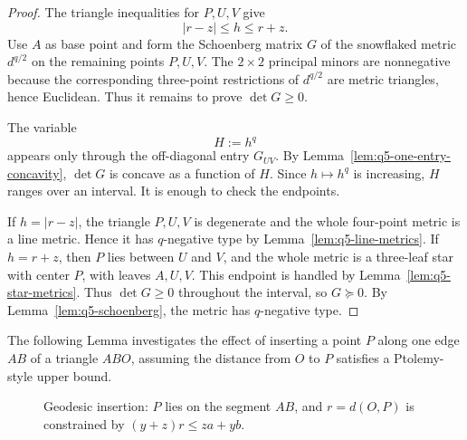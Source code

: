 \documentclass[12pt]{amsart}
\theoremstyle{definition}
\newcommand{\1}{\mathbf{1}}
\begin{document}
\begin{proof}
The triangle inequalities for $P,U,V$ give
\[
        |r-z|\le h\le r+z.
\]
Use $A$ as base point and form the Schoenberg matrix $G$ of the snowflaked metric
$d^{q/2}$ on the remaining points $P,U,V$.  The $2\times2$ principal minors
are nonnegative because the corresponding three-point restrictions of $d^{q/2}$ are
metric triangles, hence Euclidean.  Thus it remains to prove $\det G\ge0$.

The variable
\[
        H:=h^q
\]
appears only through the off-diagonal entry $G_{UV}$.  By
Lemma~\ref{lem:q5-one-entry-concavity}, $\det G$ is concave as a function of $H$.
Since $h\mapsto h^q$ is increasing, $H$ ranges over an interval.  It is enough to
check the endpoints.

If $h=|r-z|$, the triangle $P,U,V$ is degenerate and the whole four-point metric
is a line metric.  Hence it has $q$-negative type by Lemma~\ref{lem:q5-line-metrics}.
If $h=r+z$, then $P$ lies between $U$ and $V$, and the whole metric is a
three-leaf star with center $P$, with leaves $A,U,V$.  This endpoint is handled by
Lemma~\ref{lem:q5-star-metrics}.  Thus $\det G\ge0$ throughout the interval, so
$G\succeq0$.  By Lemma~\ref{lem:q5-schoenberg}, the metric has $q$-negative type.
\end{proof}

The following Lemma investigates the effect of inserting a point $P$ along one edge $AB$ of a triangle $ABO$, assuming the distance from $O$ to $P$ satisfies a Ptolemy-style upper bound.

\begin{figure}[ht]
\centering
{}
\caption{Geodesic insertion: $P$ lies on the segment $AB$, and $r=d(O,P)$ is constrained by $(y+z)r\le za+yb$.}
\label{fig:geodesic-insertion}
\end{figure}
\end{document}
